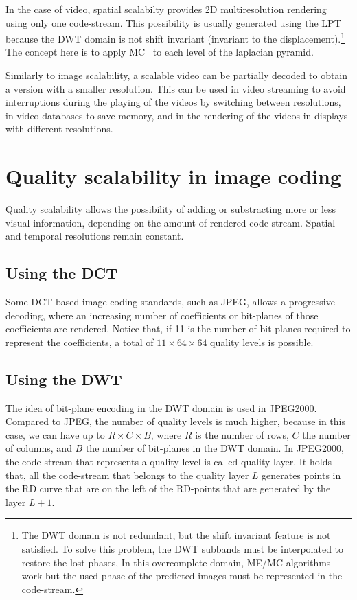 
In the case of video, spatial scalabilty provides 2D multiresolution
rendering using only one code-stream. This possibility is usually
generated using the LPT because the DWT domain is not shift invariant
(invariant to the displacement).\footnote{The DWT domain is not
  redundant, but the shift invariant feature is not satisfied. To
  solve this problem, the DWT subbands must be interpolated to restore
  the lost phases, In this overcomplete domain, ME/MC algorithms work
  but the used phase of the predicted images must be represented in
  the code-stream.} The concept here is to apply MC~\cite{vruiz__MC}
to each level of the laplacian pyramid.

Similarly to image scalability, a scalable video can be partially
decoded to obtain a version with a smaller resolution. This can be
used in video streaming to avoid interruptions during the playing of
the videos by switching between resolutions, in video databases to
save memory, and in the rendering of the videos in displays with
different resolutions.


\section{Quality scalability in image coding}


Quality scalability allows the possibility of adding or substracting
more or less visual information, depending on the amount of rendered
code-stream. Spatial and temporal resolutions remain constant.

\subsection{Using the DCT}

Some DCT-based image coding standards, such as JPEG, allows a
progressive decoding, where an increasing number of coefficients or
bit-planes of those coefficients are rendered. Notice that, if 11 is
the number of bit-planes required to represent the coefficients, a
total of $11\times 64\times 64$ quality levels is possible.

\subsection{Using the DWT~\cite{vruiz__JPEG2000}}

The idea of bit-plane encoding in the DWT domain is used in
JPEG2000. Compared to JPEG, the number of quality levels is much
higher, because in this case, we can have up to $R\times C\times B$,
where $R$ is the number of rows, $C$ the number of columns, and $B$
the number of bit-planes in the DWT domain. In JPEG2000, the
code-stream that represents a quality level is called quality
layer. It holds that, all the code-stream that belongs to the quality
layer $L$ generates points in the RD curve that are on the left of the
RD-points that are generated by the layer $L+1$.


